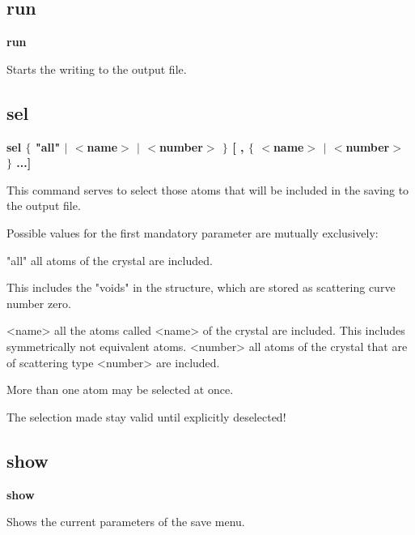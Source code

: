 \subsection*{run}
{\bf run \par }
\par
\vspace{3pt}
Starts the writing to the output file. 
\subsection*{sel}
{\bf sel $ \{$ "all" $| $ $ <$name$> $ $| $ $ <$number$> $ $\} $ [ , $ \{$ $ <$name$> $ $| $ $ <$number$> $ $\} $ ...] \par }
\par
\vspace{3pt}
This command serves to select those atoms that will be included 
in the saving to the output file. 
\par
Possible values for the first mandatory parameter are mutually 
exclusively: 
\par
\begin{MacVerbatim}
"all"     all atoms of the crystal are included.
\end{MacVerbatim}
          This includes the "voids" in the structure, which are stored 
          as scattering curve number zero. 
\begin{MacVerbatim}
<name>    all the atoms called <name> of the crystal are included.
          This includes symmetrically not equivalent atoms.
<number>  all atoms of the crystal that are of scattering type <number>
          are included.
\end{MacVerbatim}
More than one atom may be selected at once. 
\par
The selection made stay valid until explicitly deselected! 
\subsection*{show}
{\bf show \par }
\par
\vspace{3pt}
Shows the current parameters of the save menu. 
